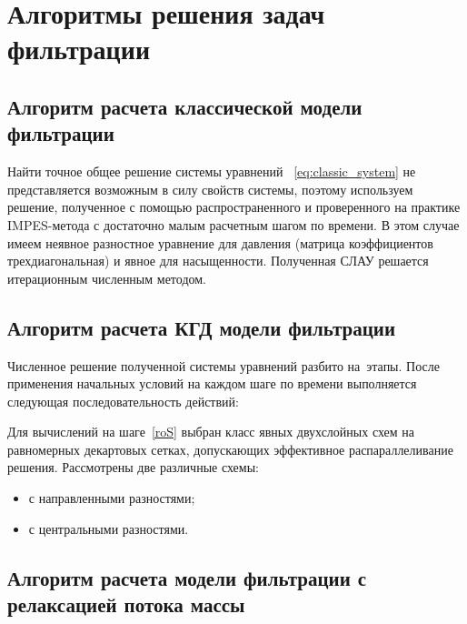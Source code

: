 \chapter{Алгоритмы решения задач фильтрации} \label{ch:ch2}

\section{Алгоритм расчета классической модели фильтрации} \label{sec:ch2/sec1}

Найти точное общее решение системы уравнений ~\eqref{eq:classic_system} не представляется возможным в силу свойств системы, поэтому используем решение, полученное с помощью распространенного и проверенного на практике IMPES-метода с достаточно малым расчетным шагом по времени.
В этом случае имеем неявное разностное уравнение для давления (матрица коэффициентов трехдиагональная) и явное для насыщенности. Полученная СЛАУ решается итерационным численным методом.

\section{Алгоритм расчета КГД модели фильтрации} \label{sec:ch2/sec2}

Численное решение полученной системы уравнений разбито на~этапы. После
применения начальных условий на каждом шаге по времени выполняется следующая
последовательность действий: 
Для вычислений на шаге~\ref{roS} выбран класс явных двухслойных схем на равномерных декартовых сетках,
допускающих эффективное распараллеливание решения.
Рассмотрены две различные схемы:
\begin{itemize}
\item с направленными разностями;
\item с центральными разностями.
\end{itemize}

\section{Алгоритм расчета модели фильтрации с релаксацией потока массы} \label{sec:ch2/sec3}

